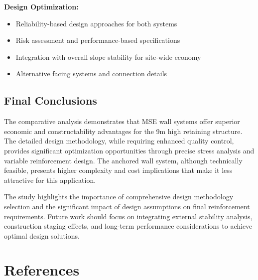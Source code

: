 \documentclass[10pt,a4paper,twocolumn]{article}
\begin{document}
\textbf{Design Optimization:}
\begin{itemize}
\item Reliability-based design approaches for both systems
\item Risk assessment and performance-based specifications
\item Integration with overall slope stability for site-wide economy
\item Alternative facing systems and connection details
\end{itemize}

\subsection{Final Conclusions}

The comparative analysis demonstrates that MSE wall systems offer superior economic and constructability advantages for the 9m high retaining structure. The detailed design methodology, while requiring enhanced quality control, provides significant optimization opportunities through precise stress analysis and variable reinforcement design. The anchored wall system, although technically feasible, presents higher complexity and cost implications that make it less attractive for this application.

The study highlights the importance of comprehensive design methodology selection and the significant impact of design assumptions on final reinforcement requirements. Future work should focus on integrating external stability analysis, construction staging effects, and long-term performance considerations to achieve optimal design solutions.

\section{References}
\end{document}
